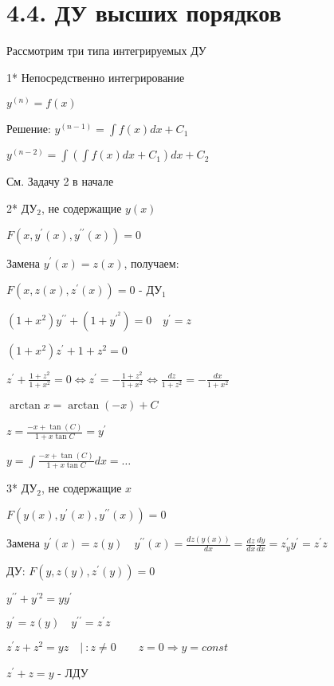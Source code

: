\documentclass[12pt]{article}
\begin{document}
    \section{4.4. ДУ высших порядков}

    \hypertarget{differentilaequationshigherdegree}{}

    \Nota Рассмотрим три типа интегрируемых ДУ

    1* Непосредственно интегрирование

    $y^{(n)} = f(x)$

    Решение: $y^{(n - 1)} = \int f(x) dx + C_1$

    $y^{(n - 2)} = \int (\int f(x) dx + C_1) dx + C_2$

    \Ex См. Задачу 2 в начале

    2* ДУ$_2$, не содержащие $y(x)$

    $F(x, y^\prime(x), y^{\prime\prime}(x)) = 0$

    Замена $y^\prime(x) = z(x)$, получаем:

    $F(x, z(x), z^\prime(x)) = 0$ - ДУ$_1$

    \Ex $(1 + x^2)y^{\prime\prime} + (1 + y^\prime^2) = 0 \quad y^\prime = z$

    $(1 + x^2)z^\prime + 1 + z^2 = 0$

    $z^\prime + \frac{1 + z^2}{1 + x^2} = 0 \Longleftrightarrow z^\prime = -\frac{1 + z^2}{1 + x^2} \Longleftrightarrow \frac{dz}{1 + z^2} = -\frac{dx}{1 + x^2}$

    $\arctan x = \arctan(-x) + C$

    $z = \frac{-x + \tan(C)}{1 + x \tan C} = y^\prime$

    $y = \int \frac{-x + \tan(C)}{1 + x \tan C} dx = \dots $

    3* ДУ$_2$, не содержащие $x$

    $F(y(x), y^\prime(x), y^{\prime\prime}(x)) = 0$

    Замена $y^\prime(x) = z(y) \quad y^{\prime\prime}(x) = \frac{dz(y(x))}{dx} = \frac{dz}{dx} \frac{dy}{dx} = z^\prime_y y^\prime = z^\prime z$

    ДУ: $F(y, z(y), z^\prime(y)) = 0$

    \Ex $y^{\prime\prime} + y^{\prime 2} = yy^\prime$

    $y^\prime = z(y) \quad y^{\prime\prime} = z^\prime z$

    $z^\prime z + z^2 = yz \quad | \ : z \neq 0 \quad\quad z = 0 \Longrightarrow y = const$

    $z^\prime + z = y$ - ЛДУ
\end{document}
